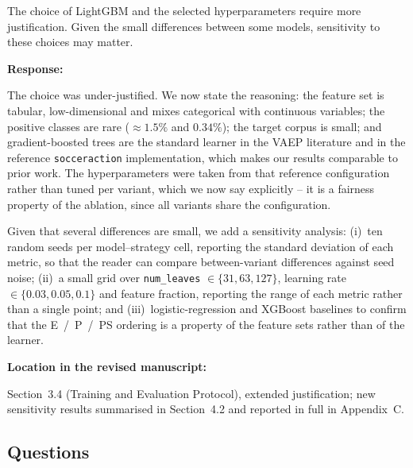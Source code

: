 \documentclass[11pt,a4paper]{article}
\newcommand{\pending}[1]{\textcolor{statuspending}{#1}}
\newcommand{\response}[2]{%
  \begin{responsebox}
  \textbf{Response:}

  #1
  \end{responsebox}
  \begin{locationbox}
  \textbf{Location in the revised manuscript:}

  #2
  \end{locationbox}
}
\begin{document}
\begin{reviewbox}[Comment 8]
The choice of LightGBM and the selected hyperparameters require more justification. Given the small differences between some models, sensitivity to these choices may matter.
\end{reviewbox}
\response{The choice was under-justified. We now state the reasoning: the feature set is tabular, low-dimensional and mixes categorical with continuous variables; the positive classes are rare ($\approx 1.5\%$ and $0.34\%$); the target corpus is small; and gradient-boosted trees are the standard learner in the VAEP literature and in the reference \texttt{socceraction} implementation, which makes our results comparable to prior work. The hyperparameters were taken from that reference configuration rather than tuned per variant, which we now say explicitly -- it is a fairness property of the ablation, since all variants share the configuration.

\pending{Given that several differences are small, we add a sensitivity analysis: (i)~ten random seeds per model--strategy cell, reporting the standard deviation of each metric, so that the reader can compare between-variant differences against seed noise; (ii)~a small grid over \texttt{num\_leaves} $\in \{31, 63, 127\}$, learning rate $\in \{0.03, 0.05, 0.1\}$ and feature fraction, reporting the range of each metric rather than a single point; and (iii)~logistic-regression and XGBoost baselines to confirm that the E~/~P~/~PS ordering is a property of the feature sets rather than of the learner.}}{Section~3.4 (Training and Evaluation Protocol), extended justification; new sensitivity results summarised in Section~4.2 and reported in full in Appendix~C.}

\subsection{Questions}
\end{document}
